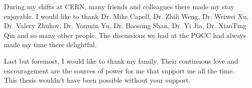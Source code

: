 During my shifts at CERN, many friends and colleagues there made my stay enjoyable. I would like to thank Dr. Mike Capell, Dr. Zhili Weng, Dr. Weiwei Xu, Dr. Valery Zhukov, Dr. Youmin Yu, Dr. Baosong Shan, Dr. Yi Jia, Dr. XiaoTing Qin and so many other people. The discussions we had at the POCC had always made my time there delightful.   \par

Last but foremost, I would like to thank my family. Their continuous love and encouragement are the sources of power for me that support me all the time. This thesis wouldn't have been possible without your support. 

